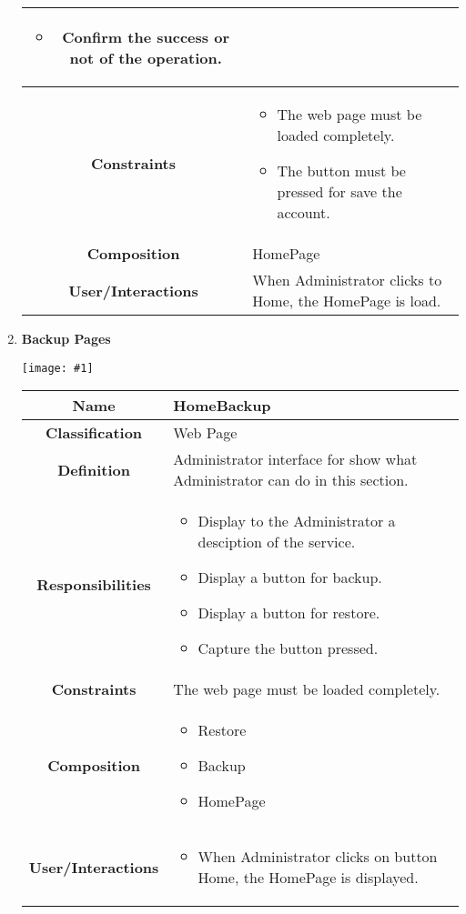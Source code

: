 \documentclass[11pt, a4paper,titlepage]{article}
\newcommand{\image}[1]{
	\begin{center}
		\noindent \texttt{[image: \#1]}
	\end{center}
	}
\begin{document}
\begin{enumerate}
\begin{tabularx}{\textwidth}{| c | X |}
\begin{itemize}
		\item Confirm the success or not of the operation.
	\end{itemize}
	\\
	\hline
	\textbf{Constraints} &
	\begin{itemize}
		\item The web page must be loaded completely.
		\item The button must be pressed for save the account.
	\end{itemize}
	\\
	\hline
	\textbf{Composition} & HomePage
	\\
	\hline
	\textbf{User/Interactions} & When Administrator clicks to Home, the HomePage is load.
	\\
	\hline 
\end{tabularx}
\newpage
\item \textbf{Backup Pages}\\
\image{page_backup.png}
\begin{tabularx}{\textwidth}{| c | X |}
	\hline
	\textbf{Name} &
	HomeBackup
	\\
	\hline
	\textbf{Classification} &
	Web Page
	\\
	\hline
	\textbf{Definition} &
	Administrator interface for show what Administrator can do in this section.\\
	\hline
	\textbf{Responsibilities} &
	\begin{itemize}
		\item Display to the Administrator a desciption of the service.
		\item Display a button for backup.
		\item Display a button for restore.
		\item Capture the button pressed.
	\end{itemize}
	\\
	\hline
	\textbf{Constraints} & The web page must be loaded completely.
	\\
	\hline
	\textbf{Composition} &
	\begin{itemize}
		\item Restore
		\item Backup
		\item HomePage
	\end{itemize}
	\\
	\hline
	\textbf{User/Interactions} &
	\begin{itemize}
		\item When Administrator clicks on button Home, the HomePage is displayed.

\end{itemize}
\end{tabularx}
\end{enumerate}
\end{document}

